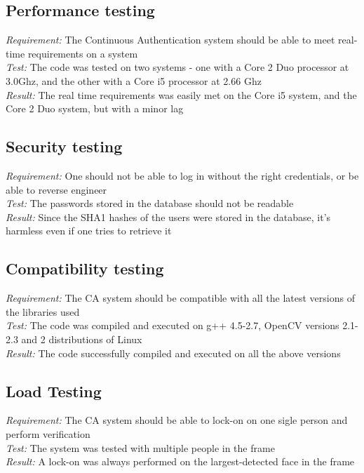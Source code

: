 \documentclass[12pt]{article}			%
\begin{document}
\subsection{ Performance testing } 
\emph{ Requirement: } The Continuous Authentication system should be able to meet real-time requirements on a system\\
\emph{ Test: } The code was tested on two systems - one with a Core 2 Duo processor at 3.0Ghz, and the other with a Core i5 processor at 2.66 Ghz\\
\emph{ Result: } The real time requirements was easily met on the Core i5 system, and the Core 2 Duo system, but with a minor lag\\

\subsection{ Security testing}
\emph{ Requirement: } One should not be able to log in without the right credentials, or be able to reverse engineer\\
\emph{ Test: } The passwords stored in the database should not be readable\\
\emph{ Result: } Since the SHA1 hashes of the users were stored in the database, it's harmless even if one tries to retrieve it\\

\subsection{ Compatibility testing }
\emph{ Requirement: } The CA system should be compatible with all the latest versions of the libraries used\\
\emph{ Test: } The code was compiled and executed on g++ 4.5-2.7, OpenCV versions 2.1-2.3 and 2 distributions of Linux\\
\emph{ Result: } The code successfully compiled and executed on all the above versions\\

\subsection{ Load Testing }
\emph{ Requirement: } The CA system should be able to lock-on on one sigle person and perform verification \\
\emph{ Test: } The system was tested with multiple people in the frame\\
\emph{ Result: } A lock-on was always performed on the largest-detected face in the frame\\
\end{document}
